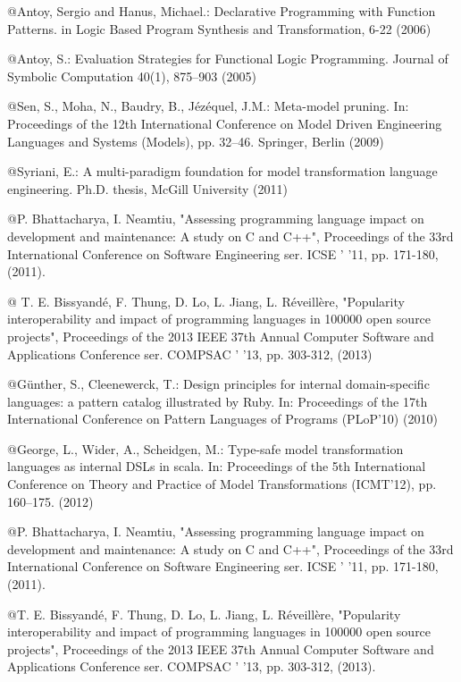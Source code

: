 \documentclass{sig-alternate}
\begin{document}
\begin{thebibliography}{9}
{{				\bibitem @Antoy, Sergio and Hanus, Michael.:
				Declarative Programming with Function Patterns. in
				Logic Based Program Synthesis and Transformation,
				6-22 (2006)
			}
			
			
			\bibitem @Antoy, S.: Evaluation Strategies for Functional Logic Programming. Journal of Symbolic Computation 40(1), 875–903 (2005)
		}
		
		
		
		\bibitem @Sen, S., Moha, N., Baudry, B., Jézéquel, J.M.: Meta-model pruning. In: Proceedings of the 12th International Conference on Model Driven Engineering Languages and Systems (Models), pp. 32–46. Springer, Berlin (2009)
		
		
		\bibitem @Syriani, E.: A multi-paradigm foundation for model transformation language engineering. Ph.D. thesis, McGill University (2011)
		
		
		
		\bibitem @P. Bhattacharya, I. Neamtiu, "Assessing programming language impact on development and maintenance: A study on C and C++", Proceedings of the 33rd International Conference on Software Engineering ser. ICSE ' '11, pp. 171-180, (2011).
		
		
		\bibitem @ T. E. Bissyandé, F. Thung, D. Lo, L. Jiang, L. Réveillère, "Popularity interoperability and impact of programming languages in 100000 open source projects", Proceedings of the 2013 IEEE 37th Annual Computer Software and Applications Conference ser. COMPSAC ' '13, pp. 303-312, (2013)
		
		
		\bibitem @Günther, S., Cleenewerck, T.: Design principles for internal domain-specific languages: a pattern catalog illustrated by Ruby. In: Proceedings of the 17th International Conference on Pattern Languages of Programs (PLoP'10) (2010)
		
		
		
		\bibitem @George, L., Wider, A., Scheidgen, M.: Type-safe model transformation languages as internal DSLs in scala. In: Proceedings of the 5th International Conference on Theory and Practice of Model Transformations (ICMT'12), pp. 160–175. (2012)
		
		
		\bibitem @P. Bhattacharya, I. Neamtiu, "Assessing programming language impact on development and maintenance: A study on C and C++", Proceedings of the 33rd International Conference on Software Engineering ser. ICSE ' '11, pp. 171-180, (2011).
		
		
		\bibitem @T. E. Bissyandé, F. Thung, D. Lo, L. Jiang, L. Réveillère, "Popularity interoperability and impact of programming languages in 100000 open source projects", Proceedings of the 2013 IEEE 37th Annual Computer Software and Applications Conference ser. COMPSAC ' '13, pp. 303-312, (2013).
		

\end{thebibliography}
\end{document}

